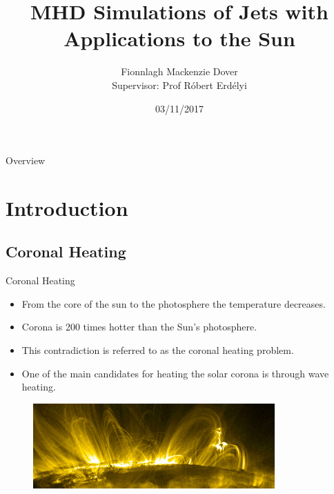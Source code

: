 \documentclass{beamer}
\title[ ]{MHD Simulations of Jets with Applications to the Sun} %
\author[Fionnlagh Mackenzie Dover]{Fionnlagh Mackenzie Dover \\ Supervisor: Prof R\'{o}bert Erd\'{e}lyi } %
\institute[SP$^2$RC] %
{
University of Sheffield \\ %
\medskip
}
\date{03/11/2017} %
\begin{document}
\begin{frame}
\titlepage %
\end{frame}

\begin{frame}{Overview}

\tableofcontents %
\end{frame}


\section{Introduction} %
\subsection{Coronal Heating} %
\begin{frame}
\begin{block}{Coronal Heating}
\begin{itemize}
\item From the core of the sun to the photosphere the temperature decreases.
\item Corona is 200 times hotter than the Sun's photosphere.
\item This contradiction is referred to as the coronal heating problem. 
\item One of the main candidates for heating the solar corona is through wave heating.
\end{itemize}
\end{block}
\begin{figure}
\centering
\includegraphics[width = 0.825\textwidth]{images/loop.png}
\end{figure}
\end{frame}
\end{document}
